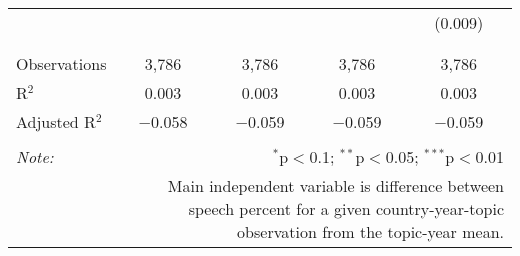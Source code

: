 \begin{table}[!htbp]
\begin{tabular}{@{\extracolsep{5pt}}lcccc}
  &  &  &  & (0.009) \\ 
  & & & & \\ 
\hline \\[-1.8ex] 
Observations & 3,786 & 3,786 & 3,786 & 3,786 \\ 
R$^{2}$ & 0.003 & 0.003 & 0.003 & 0.003 \\ 
Adjusted R$^{2}$ & $-$0.058 & $-$0.059 & $-$0.059 & $-$0.059 \\ 
\hline 
\hline \\[-1.8ex] 
\textit{Note:}  & \multicolumn{4}{r}{$^{*}$p$<$0.1; $^{**}$p$<$0.05; $^{***}$p$<$0.01} \\ 
 & \multicolumn{4}{r}{Main independent variable is difference between speech percent for a given country-year-topic observation from the topic-year mean.} \\ 
\end{tabular} 
\end{table} 
